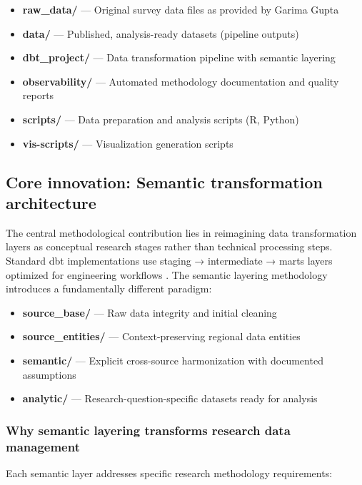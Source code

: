 \documentclass{article}
\begin{document}
\begin{itemize}
    \item \textbf{raw\_data/} — Original survey data files as provided by Garima Gupta
    \item \textbf{data/} — Published, analysis-ready datasets (pipeline outputs)
    \item \textbf{dbt\_project/} — Data transformation pipeline with semantic layering
    \item \textbf{observability/} — Automated methodology documentation and quality reports
    \item \textbf{scripts/} — Data preparation and analysis scripts (R, Python)
    \item \textbf{vis-scripts/} — Visualization generation scripts
\end{itemize}

\subsection{Core innovation: Semantic transformation architecture}
\label{subsec:core-innovation}

The central methodological contribution lies in reimagining data transformation layers as conceptual research stages rather than technical processing steps. Standard dbt implementations use staging → intermediate → marts layers optimized for engineering workflows \cite{dbt_docs_structure}. The semantic layering methodology introduces a fundamentally different paradigm:

\begin{itemize}
    \item \textbf{source\_base/} — Raw data integrity and initial cleaning
    \item \textbf{source\_entities/} — Context-preserving regional data entities
    \item \textbf{semantic/} — Explicit cross-source harmonization with documented assumptions
    \item \textbf{analytic/} — Research-question-specific datasets ready for analysis
\end{itemize}

\subsubsection{Why semantic layering transforms research data management}
\label{subsubsec:semantic-benefits}

Each semantic layer addresses specific research methodology requirements:
\end{document}
